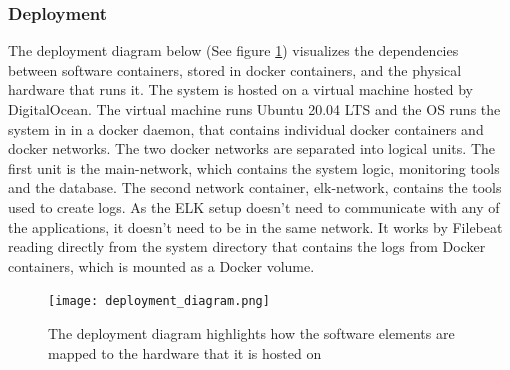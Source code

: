 \subsubsection{Deployment}
The deployment diagram below (See figure \ref{fig:deployment_diagram}) visualizes the dependencies between software containers, stored in docker containers, and the physical hardware that runs it. The system is hosted on a virtual machine hosted by DigitalOcean. The virtual machine runs Ubuntu 20.04 LTS and the OS runs the system in in a docker daemon, that contains individual docker containers and docker 
networks. 
\newline
The two docker networks are separated into logical units. The first unit is the main-network, which contains the system logic, monitoring tools and the database. The second network container, elk-network, contains the tools used to create logs. As the ELK setup doesn't need to communicate with any of the applications, it doesn't need to be in the same network. It works by Filebeat reading directly from the system directory that contains the logs from Docker containers, which is mounted as a Docker volume.


\begin{figure}[H]
    \centering
    \texttt{[image: deployment\_diagram.png]}
    \caption{The deployment diagram highlights how the software elements are mapped to the hardware that it is hosted on}
    \label{fig:deployment_diagram}
\end{figure}



